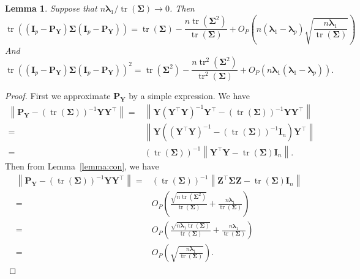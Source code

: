 \documentclass[12pt]{article} %
\DeclareMathOperator{\mytr}{tr}
\newcommand{\bZ}{\mathbf{Z}}
\newcommand{\bP}{\mathbf{P}}
\newcommand{\bY}{\mathbf{Y}}
\newcommand{\bI}{\mathbf{I}}
\newcommand{\bfsym}[1]{\ensuremath{\boldsymbol{#1}}}
\def\blambda {\bfsym {\lambda}}
\def\bSigma {\bfsym {\Sigma}}
\newtheorem{lemma}{Lemma}
\theoremstyle{definition}
\begin{document}
\begin{appendices}
\begin{lemma}
    \label{fenLemma1}
    Suppose that $n\blambda_1/\mytr(\bSigma)\to 0$.
    Then
    \begin{equation*}
        \mytr \left( (\bI_p-\bP_{\bY})\bSigma (\bI_p-\bP_{\bY})\right)=
        \mytr(\bSigma)-\frac{n\mytr(\bSigma^2)}{\mytr(\bSigma)}
        +O_P\left(n(\blambda_1-\blambda_p)\sqrt{\frac{n\blambda_1}{\mytr(\bSigma)}}\right)
    \end{equation*}
    And
    \begin{equation*}
        \mytr \left( (\bI_p-\bP_{\bY})\bSigma (\bI_p-\bP_{\bY})\right)^2=
        \mytr(\bSigma^2)-\frac{n\mytr^2 (\bSigma^2)}{\mytr^2(\bSigma)}+O_P(n\blambda_1(\blambda_1-\blambda_p)).
    \end{equation*}
\end{lemma}
\begin{proof}
    First we approximate $\bP_{\bY}$ by a simple expression.
    We have
        \begin{equation*}
            \begin{split}
        \left\|
        \bP_{\bY}
        -(\mytr(\bSigma))^{-1} \bY \bY^\top
        \right\|
        =  
        &
        \left\|
        \bY (\bY^\top \bY)^{-1} \bY^\top
    -(\mytr(\bSigma))^{-1} \bY \bY^\top
        \right\|
        \\
        =&
        \left\|
        \bY \left(
            (\bY^\top \bY)^{-1}
            -(\mytr(\bSigma))^{-1} \bI_n
        \right)
            \bY^\top
        \right\|
        \\
        =&
        (\mytr(\bSigma))^{-1}
        \left\|
        \bY^\top \bY -\mytr(\bSigma)\bI_n
        \right\|.
            \end{split}
        \end{equation*}
        Then from Lemma~\ref{lemma:con}, we have
        \begin{equation}\label{fenEq1}
            \begin{split}
        \left\|
        \bP_{\bY}
        -(\mytr(\bSigma))^{-1} \bY \bY^\top
        \right\|
        =&
        (\mytr(\bSigma))^{-1}
        \left\|
        \bZ^\top \bSigma \bZ -\mytr(\bSigma)\bI_n
        \right\|
        \\
        =&O_P\left(
            \frac{\sqrt{n\mytr(\bSigma^2)}} {\mytr(\bSigma)}
            +\frac{n\blambda_1}{\mytr(\bSigma)}
        \right)
        \\
        =&O_P\left(
            \frac{\sqrt{n\blambda_1\mytr(\bSigma)}} {\mytr(\bSigma)}
            +\frac{n\blambda_1}{\mytr(\bSigma)}
        \right)
        \\
        =&O_P\left(
            \sqrt{\frac{n\blambda_1} {\mytr(\bSigma)}}
        \right).
        \end{split}
        \end{equation}


\end{proof}
\end{appendices}
\end{document}
